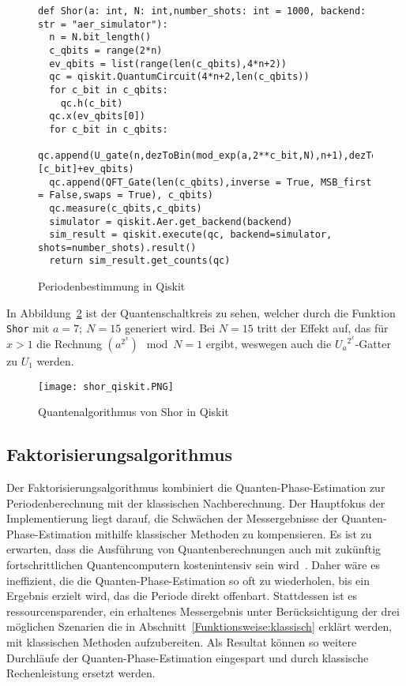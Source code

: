 \begin{figure}[H]
  \caption{Periodenbestimmung in Qiskit}
  \label{code:Periodenbestimmung}
\begin{verbatim}  
def Shor(a: int, N: int,number_shots: int = 1000, backend: str = "aer_simulator"):
  n = N.bit_length()
  c_qbits = range(2*n)
  ev_qbits = list(range(len(c_qbits),4*n+2))
  qc = qiskit.QuantumCircuit(4*n+2,len(c_qbits)) 
  for c_bit in c_qbits:
    qc.h(c_bit)
  qc.x(ev_qbits[0])
  for c_bit in c_qbits:
    qc.append(U_gate(n,dezToBin(mod_exp(a,2**c_bit,N),n+1),dezToBin(N,n+1)),[c_bit]+ev_qbits)
  qc.append(QFT_Gate(len(c_qbits),inverse = True, MSB_first = False,swaps = True), c_qbits)
  qc.measure(c_qbits,c_qbits)
  simulator = qiskit.Aer.get_backend(backend)
  sim_result = qiskit.execute(qc, backend=simulator, shots=number_shots).result()
  return sim_result.get_counts(qc)
  \end{verbatim}
\end{figure}

In Abbildung~\ref{fig:shor_qiskit} ist der Quantenschaltkreis zu sehen, 
welcher durch die Funktion \texttt{Shor} mit \(a=7;~N=15\) generiert wird.
Bei \(N=15\) tritt der Effekt auf, das für \(x>1\) die Rechnung \((a^{2^x})\mod N = 1\) ergibt, 
weswegen auch die \({U_a}^{2^x}\)-Gatter zu \(U_1\) werden.

\begin{figure} [H]
  \caption{Quantenalgorithmus von Shor in Qiskit}
  \label{fig:shor_qiskit}
  \texttt{[image: shor\_qiskit.PNG]}
  \centering
  \end{figure}

\subsection{Faktorisierungsalgorithmus}
Der Faktorisierungsalgorithmus kombiniert die Quanten-Phase-Estimation zur Periodenberechnung mit  
der klassischen Nachberechnung. 
Der Hauptfokus der Implementierung liegt darauf, 
die Schwächen der Messergebnisse der Quanten-Phase-Estimation mithilfe klassischer Methoden zu kompensieren.
Es ist zu erwarten, 
dass die Ausführung von Quantenberechnungen auch mit zukünftig fortschrittlichen Quantencomputern kostenintensiv sein wird~\cite{Shor_1997}.
Daher wäre es ineffizient, 
die die Quanten-Phase-Estimation so oft zu wiederholen, 
bis ein Ergebnis erzielt wird, das die Periode direkt offenbart.
Stattdessen ist es ressourcensparender, ein erhaltenes Messergebnis 
unter Berücksichtigung der drei möglichen Szenarien 
die in Abschnitt~\ref{Funktionsweise:klassisch} erklärt werden,
mit klassischen Methoden aufzubereiten. 
Als Resultat können so weitere Durchläufe der Quanten-Phase-Estimation eingespart und 
durch klassische Rechenleistung ersetzt werden.

